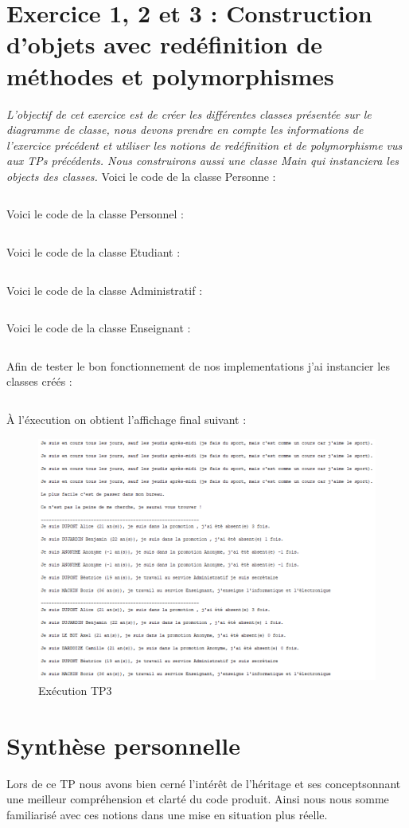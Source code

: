 \section{Exercice 1, 2 et 3 : Construction d'objets avec redéfinition de méthodes et polymorphismes}
\textit{L'objectif de cet exercice est de créer les différentes classes présentée sur le diagramme de classe, nous devons prendre en compte les informations de l'exercice précédent et utiliser les notions de redéfinition et de polymorphisme vus aux TPs précédents. Nous construirons aussi une classe Main qui instanciera les objects des classes.}
Voici le code de la classe Personne :
\inputminted[linenos,firstline=3,lastline=45]{java}{../sources/src/tp3/Personne.java}
Voici le code de la classe Personnel :
\inputminted[linenos,firstline=3,lastline=38]{java}{../sources/src/tp3/Personnel.java}
Voici le code de la classe Etudiant :
\inputminted[linenos,firstline=3,lastline=43]{java}{../sources/src/tp3/Etudiant.java}
Voici le code de la classe Administratif :
\inputminted[linenos,firstline=3,lastline=28]{java}{../sources/src/tp3/Administratif.java}
Voici le code de la classe Enseignant :
\inputminted[linenos,firstline=3,lastline=33]{java}{../sources/src/tp3/Enseignant.java}

Afin de tester le bon fonctionnement de nos implementations j'ai instancier les classes créés :
\inputminted[linenos,firstline=3,lastline=48]{java}{../sources/src/tp3/Main.java}

À l'éxecution on obtient l’affichage final suivant :
\begin{figure}[H]
  \centering
  \includegraphics[width=450pt]{./tp/Pictures/tp3-execute}
  \caption{Exécution TP3}
  \label{Exécution TP3}
\end{figure}

\section{Synthèse personnelle}
Lors de ce TP nous avons bien cerné l'intérêt de l'héritage et ses conceptsonnant une meilleur compréhension et clarté du code produit. Ainsi nous nous somme familiarisé avec ces notions dans une mise en situation plus réelle.
